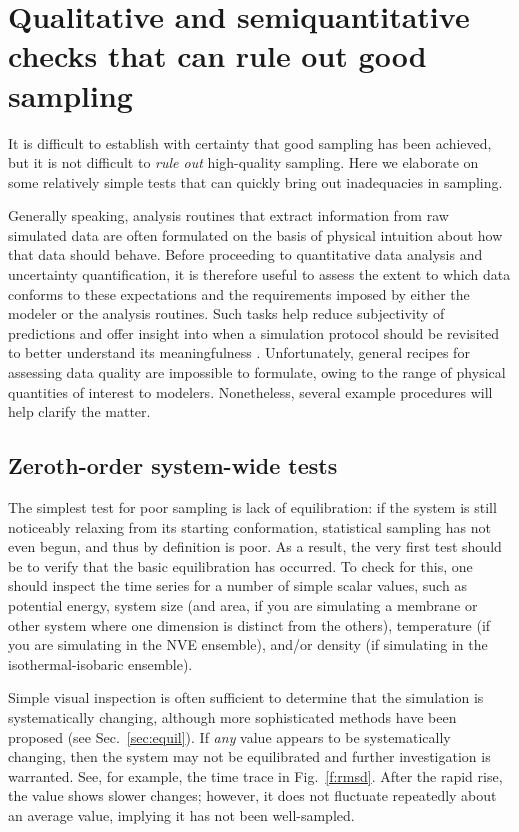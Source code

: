 
\section{Qualitative and semiquantitative checks that can rule out good sampling}
\label{sec:quick}

It is difficult to establish with certainty that good sampling has been achieved, but it is not difficult to \emph{rule out} high-quality sampling.
Here we elaborate on some relatively simple tests that can quickly bring out inadequacies in sampling.

Generally speaking, analysis routines that extract information from raw simulated data are often formulated on the basis of physical intuition about how that data should behave.  Before proceeding to quantitative data analysis and uncertainty quantification, it is therefore useful to assess the extent to which data conforms to these expectations and the requirements imposed by either the modeler or the analysis routines.  Such tasks help reduce subjectivity of predictions and offer insight into when a simulation protocol should be revisited to better understand its meaningfulness \cite{patrone1}.  Unfortunately, general recipes for assessing data quality are impossible to formulate, owing to the range of physical quantities of interest to modelers.  Nonetheless, several example procedures will help clarify the matter.

\subsection{Zeroth-order system-wide tests}
\label{sec:zeroth}

The simplest test for poor sampling is lack of equilibration: if the system is still noticeably relaxing from its starting conformation, statistical sampling has not even begun, and thus by definition is poor.  As a result, the very first test should be to verify that the basic equilibration has occurred.  To check for this, one should inspect the time series for a number of simple scalar values, such as potential energy, system size (and area, if you are simulating a membrane or other system where one dimension is distinct from the others), temperature (if you are simulating in the NVE ensemble), and/or density (if simulating in the isothermal-isobaric ensemble).  

Simple visual inspection is often sufficient to determine that the simulation is systematically changing, although more sophisticated methods have been proposed (see Sec.\ \ref{sec:equil}).  If \emph{any} value appears to be systematically changing, %
then the system may not be equilibrated and further investigation is warranted.
See, for example, the time trace in Fig.\ \ref{f:rmsd}.
After the rapid rise, the value shows slower changes;
however, it does not fluctuate repeatedly about an average value, implying it has not been well-sampled.


